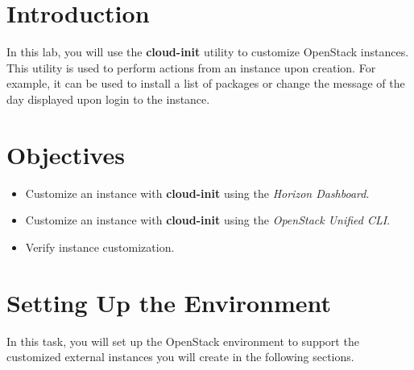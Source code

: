 \documentclass[letterpaper, 12pt]{article}
\begin{document}

\section*{Introduction}
\label{sec:introduction}
In this lab, you will use the \textbf{cloud-init} utility to customize OpenStack instances. This utility is used to
perform actions from an instance upon creation. For example, it can be used to install a list of packages or change the
message of the day displayed upon login to the instance.

\section*{Objectives}
\label{sec:objectives}
\begin{itemize}[itemsep=0pt]
    \item Customize an instance with \textbf{cloud-init} using the \textit{Horizon Dashboard}.
    \item Customize an instance with \textbf{cloud-init} using the \textit{OpenStack Unified CLI}.
    \item Verify instance customization.
\end{itemize}
\clearpage

\labsettings

\section{Setting Up the Environment}
\label{sec:settup_up_the_environment}
In this task, you will set up the OpenStack environment to support the customized external instances you will create in
the following sections.
\end{document}
